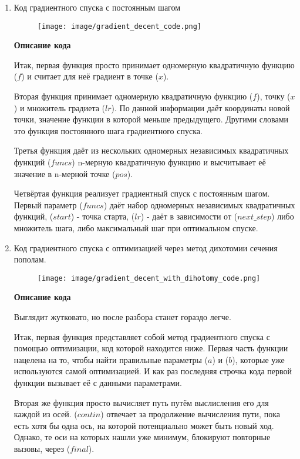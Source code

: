 \documentclass[12pt, a4paper]{article}
\begin{document}
\begin{enumerate}
    \item Код градиентного спуска с постоянным шагом

\begin{figure}[h]
\centering
\texttt{[image: image/gradient\_decent\_code.png]}
\end{figure}

\textbf{Описание кода}

Итак, первая функция просто принимает одномерную квадратичную функцию ($f$) и считает для неё градиент в точке ($x$).

Вторая функция принимает одномерную квадратичную функцию ($f$), точку ($x$) и множитель градиета ($lr$). По данной информации даёт координаты новой точки, значение функции в которой меньше предыдущего. Другими словами это функция постоянного шага градиентного спуска.

Третья функция даёт из нескольких одномерных независимых квадратичных функций ($funcs$) n-мерную квадратичную функцию и высчитывает её значение в n-мерной точке ($pos$).

Четвёртая функция реализует градиентный спуск с постоянным шагом. Первый параметр ($funcs$) даёт набор одномерных независимых квадратичных функций, ($start$) - точка старта, ($lr$) - даёт в зависимости от ($next\_step$) либо множитель шага, либо максимальный шаг при оптимальном спуске.

    \item Код градиентного спуска с оптимизацией через метод дихотомии сечения пополам.

\begin{figure}[h]
\centering
\texttt{[image: image/gradient\_decent\_with\_dihotomy\_code.png]}
\end{figure}

\textbf{Описание кода}

Выглядит жутковато, но после разбора станет гораздо легче. 

Итак, первая функция представляет собой метод градиентного спуска с помощью оптимизации, код которой находится ниже. Первая часть функции нацелена на то, чтобы найти правильные параметры ($a$) и ($b$), которые уже используются самой оптимизацией. И как раз последняя строчка кода первой функции вызывает её с данными параметрами.

Вторая же функция просто вычисляет путь путём выслисления его для каждой из осей. ($contin$) отвечает за продолжение вычисления пути, пока есть хотя бы одна ось, на которой потенциально может быть новый ход. Однако, те оси на которых нашли уже минимум, блокируют повторные вызовы, через ($final$).
    


\end{enumerate}
\end{document}
